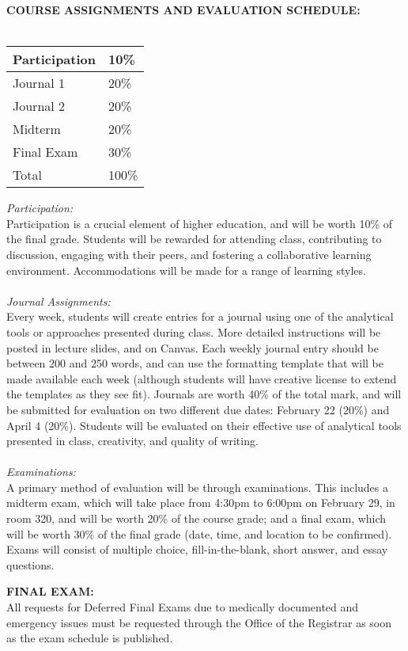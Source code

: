 \documentclass[10pt]{article}
\begin{document}
\textbf{COURSE ASSIGNMENTS AND EVALUATION SCHEDULE:}\\\\
{\renewcommand{\arraystretch}{1.2}
\begin{tabular}{|l|l|}\hline
	Participation & 10\% \\\hline
	Journal 1 & 20\% \\\hline
	Journal 2 & 20\% \\\hline
	Midterm & 20\% \\\hline
	Final Exam & 30\% \\\hline\hline
	Total & 100\% \\\hline
\end{tabular}
}

\textit{Participation:}\\ 
Participation is a crucial element of higher education, and will be worth 10\% of the final grade. Students will be rewarded for attending class, contributing to discussion, engaging with their peers, and fostering a collaborative learning environment. Accommodations will be made for a range of learning styles.\\\\
\textit{Journal Assignments:}\\
Every week, students will create entries for a journal using one of the analytical tools or approaches presented during class. More detailed instructions will be posted in lecture slides, and on Canvas. Each weekly journal entry should be between 200 and 250 words, and can use the formatting template that will be made available each week (although students will have creative license to extend the templates as they see fit). Journals are worth 40\% of the total mark, and will be submitted for evaluation on two different due dates: February 22 (20\%) and April 4 (20\%). Students will be evaluated on their effective use of analytical tools presented in class, creativity, and quality of writing.\\\\
\textit{Examinations:}\\ 
A primary method of evaluation will be through examinations. This includes a midterm exam, which will take place from 4:30pm to 6:00pm on February 29, in room 320, and will be worth 20\% of the course grade; and a final exam, which will be worth 30\% of the final grade (date, time, and location to be confirmed). Exams will consist of multiple choice, fill-in-the-blank, short answer, and essay questions. 

\textbf{FINAL EXAM:}\\
All requests for Deferred Final Exams due to medically documented and emergency issues must be requested through the Office of the Registrar as soon as the exam schedule is published.
\end{document}
